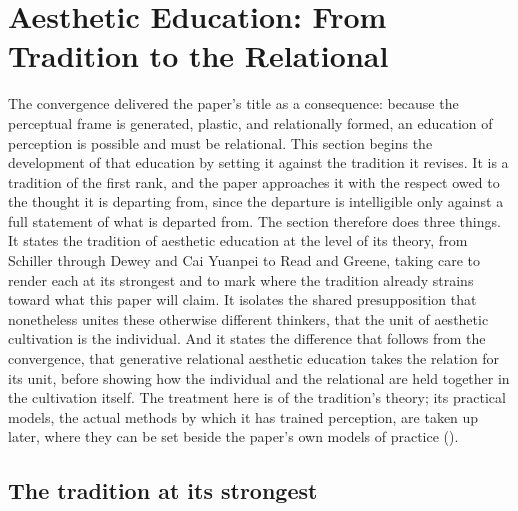 \section{Aesthetic Education: From Tradition to the Relational}
\label{p23:sec:education}

\noindent
The convergence delivered the paper's title as a consequence: because the perceptual frame is generated, plastic, and relationally formed, an education of perception is possible and must be relational. This section begins the development of that education by setting it against the tradition it revises. It is a tradition of the first rank, and the paper approaches it with the respect owed to the thought it is departing from, since the departure is intelligible only against a full statement of what is departed from. The section therefore does three things. It states the tradition of aesthetic education at the level of its theory, from Schiller through Dewey and Cai Yuanpei to Read and Greene, taking care to render each at its strongest and to mark where the tradition already strains toward what this paper will claim. It isolates the shared presupposition that nonetheless unites these otherwise different thinkers, that the unit of aesthetic cultivation is the individual. And it states the difference that follows from the convergence, that generative relational aesthetic education takes the relation for its unit, before showing how the individual and the relational are held together in the cultivation itself. The treatment here is of the tradition's theory; its practical models, the actual methods by which it has trained perception, are taken up later, where they can be set beside the paper's own models of practice ().

\subsection{The tradition at its strongest}
\label{p23:sub:edu-tradition}

